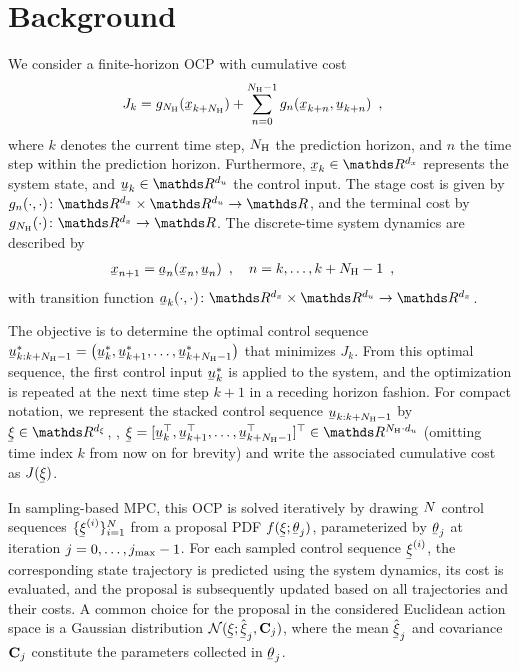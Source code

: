 \section{Background}
\label{sec:ocp}

We consider a finite-horizon \ac{OCP} with cumulative cost
\begin{align}
    \label{eq:ocp_cost}
      J_k & = g_{\horizon}(\vx_{k + \horizon}) + \sum_{n=0}^{\horizon-1} g_n(\vx_{k + n}, \vu_{k + n})  \enspace,
\end{align}
where $k$ denotes the current time step, $N_{\mathrm{H}}$ the prediction horizon, and $n$ the time step within the prediction horizon.
Furthermore, $\vx_k \in \IR^{d_x}$ represents the system state, and $\vu_k \in \IR^{d_u}$ the control input.
The stage cost is given by $g_n(\cdot, \cdot)\colon \IR^{d_x} \times \IR^{d_u} \to \IR$, and the terminal cost by $g_{\horizon}(\cdot)\colon \IR^{d_x} \to \IR$.
The discrete-time system dynamics are described by
\begin{align}
    \label{eq:system_dynamics}
    \vx_{n+1} & = \va_n(\vx_n, \vu_n) \enspace, \quad n=k,\ldots,k+\horizon-1 \enspace,
\end{align}
with transition function $\va_k(\cdot,\cdot)\colon \IR^{d_x} \times \IR^{d_u} \to \IR^{d_x}$.

%
The objective is to determine the optimal control sequence $\vu_{k:k+\horizon-1}^* = \left(\vu_k^*, \vu_{k+1}^*, \ldots, \vu_{k+\horizon-1}^*\right)$ that minimizes $J_k$.
From this optimal sequence, the first control input $\vu_k^*$ is applied to the system, and the optimization is repeated at the next time step $k+1$ in a receding horizon fashion.
For compact notation, we represent the stacked control sequence $\vu_{k:k+\horizon-1}$ by $\vVarCem \in \IR^{\dimVarCem}$, \ie, $\vVarCem = [\vu_k\T, \vu_{k+1}\T, \ldots, \vu_{k+\horizon-1}\T]\T \in \IR^{\horizon \cdot d_u}$ (omitting time index $k$ from now on for brevity) and write the associated cumulative cost as $J(\vVarCem)$.

In sampling-based \ac{MPC}, this \ac{OCP} is solved iteratively by drawing $N$ control sequences $\{\vVarCem^{(i)}\}_{i=1}^{\numCEMSamples}$ from a proposal \ac{PDF} $\pdf(\vVarCem; \vtheta_j)$, parameterized by $\vtheta_j$ at iteration $j=0,\dots, j_\mathrm{max}-1$. 
For each sampled control sequence $\vVarCem^{(i)}$, the corresponding state trajectory is predicted using the system dynamics, its cost is evaluated, and the proposal is subsequently updated based on all trajectories and their costs.
A common choice for the proposal in the considered Euclidean action space is a Gaussian distribution $\Gaussian(\vVarCem; \evVarCem_j, \mC_j)$, where the mean $\evVarCem_j$ and covariance ${{\mathbf{C}}}_j$ constitute the parameters collected in $\vtheta_j$.
